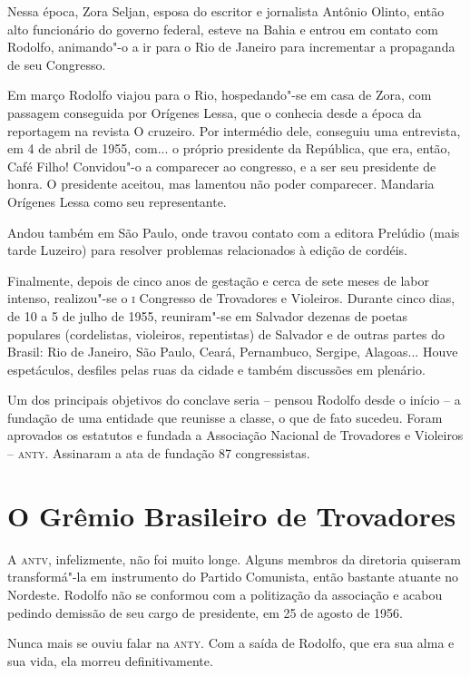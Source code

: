 Nessa época, Zora Seljan, esposa do escritor e jornalista Antônio
Olinto, então alto funcionário do governo federal, esteve na Bahia e
entrou em contato com Rodolfo, animando"-o a ir para o Rio de Janeiro
para incrementar a propaganda de seu Congresso.

Em março Rodolfo viajou para o Rio, hospedando"-se em casa de Zora,
com passagem conseguida por Orígenes Lessa, que o conhecia desde a
época da reportagem na revista O cruzeiro. Por intermédio dele,
conseguiu uma entrevista, em 4 de abril de 1955, com... o próprio
presidente da República, que era, então, Café Filho! Convidou"-o a
comparecer ao congresso, e a ser seu presidente de honra. O presidente
aceitou, mas lamentou não poder comparecer. Mandaria Orígenes Lessa
como seu representante.

Andou também em São Paulo, onde travou contato com a editora Prelúdio
(mais tarde Luzeiro) para resolver problemas relacionados à edição de
cordéis.

Finalmente, depois de cinco anos de gestação e cerca de sete meses de
labor intenso, realizou"-se o \textsc{i} Congresso de Trovadores e Violeiros.
Durante cinco dias, de 10 a 5 de julho de 1955, reuniram"-se em
Salvador dezenas de poetas populares (cordelistas, violeiros,
repentistas) de Salvador e de outras partes do Brasil: Rio de Janeiro,
São Paulo, Ceará, Pernambuco, Sergipe, Alagoas... Houve espetáculos,
desfiles pelas ruas da cidade e também discussões em plenário.

Um dos principais objetivos do conclave seria -- pensou Rodolfo
desde o início -- a fundação de uma entidade que reunisse a classe,
o que de fato sucedeu. Foram aprovados os estatutos e fundada a
Associação Nacional de Trovadores e Violeiros -- \textsc{anty}. Assinaram a ata
de fundação 87 congressistas.

\section{O Grêmio Brasileiro de Trovadores}

A \textsc{antv}, infelizmente, não foi muito longe. Alguns membros da diretoria
quiseram transformá"-la em instrumento do Partido Comunista, então
bastante atuante no Nordeste. Rodolfo não se conformou com a
politização da associação e acabou pedindo demissão de seu cargo de
presidente, em 25 de agosto de 1956.

Nunca mais se ouviu falar na \textsc{anty}. Com a saída de Rodolfo, que era sua
alma e sua vida, ela morreu definitivamente.

